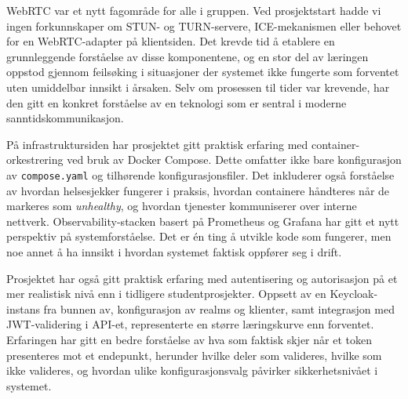 WebRTC var et nytt fagområde for alle i gruppen. Ved prosjektstart hadde vi ingen forkunnskaper om STUN- og TURN-servere, ICE-mekanismen eller behovet for en WebRTC-adapter på klientsiden. Det krevde tid å etablere en grunnleggende forståelse av disse komponentene, og en stor del av læringen oppstod gjennom feilsøking i situasjoner der systemet ikke fungerte som forventet uten umiddelbar innsikt i årsaken. Selv om prosessen til tider var krevende, har den gitt en konkret forståelse av en teknologi som er sentral i moderne sanntidskommunikasjon.


På infrastruktursiden har prosjektet gitt praktisk erfaring med container-orkestrering ved bruk av Docker Compose. Dette omfatter ikke bare konfigurasjon av \texttt{compose.yaml} og tilhørende konfigurasjonsfiler. Det inkluderer også forståelse av hvordan helsesjekker fungerer i praksis, hvordan containere håndteres når de markeres som \textit{unhealthy}, og hvordan tjenester kommuniserer over interne nettverk. Observability-stacken basert på Prometheus og Grafana har gitt et nytt perspektiv på systemforståelse. Det er én ting å utvikle kode som fungerer, men noe annet å ha innsikt i hvordan systemet faktisk oppfører seg i drift.


Prosjektet har også gitt praktisk erfaring med autentisering og autorisasjon på et mer realistisk nivå enn i tidligere studentprosjekter. Oppsett av en Keycloak-instans fra bunnen av, konfigurasjon av realms og klienter, samt integrasjon med JWT-validering i API-et, representerte en større læringskurve enn forventet. Erfaringen har gitt en bedre forståelse av hva som faktisk skjer når et token presenteres mot et endepunkt, herunder hvilke deler som valideres, hvilke som ikke valideres, og hvordan ulike konfigurasjonsvalg påvirker sikkerhetsnivået i systemet.

